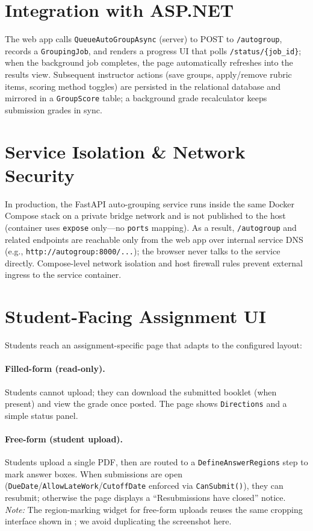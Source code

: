 \documentclass[ms,twoside,print]{nuthesis}
\begin{document}
\section{Integration with ASP.NET}
The web app calls \texttt{QueueAutoGroupAsync} (server) to POST to \texttt{/autogroup}, records a \texttt{GroupingJob}, and renders a progress UI that polls \texttt{/status/\{job\_id\}}; when the background job completes, the page automatically refreshes into the results view. Subsequent instructor actions (save groups, apply/remove rubric items, scoring method toggles) are persisted in the relational database and mirrored in a \texttt{GroupScore} table; a background grade recalculator keeps submission grades in sync.

\section{Service Isolation \& Network Security}
In production, the FastAPI auto-grouping service runs inside the same Docker Compose stack on a private bridge network and is not published to the host (container uses \texttt{expose} only—no \texttt{ports} mapping). As a result, \texttt{/autogroup} and related endpoints are reachable only from the web app over internal service DNS (e.g., \texttt{http://autogroup:8000/...}); the browser never talks to the service directly. Compose-level network isolation and host firewall rules prevent external ingress to the service container.


\section{Student-Facing Assignment UI}
Students reach an assignment-specific page that adapts to the configured layout:

\paragraph{Filled-form (read-only).}
Students cannot upload; they can download the submitted booklet (when present) and view the grade once posted. The page shows \texttt{Directions} and a simple status panel.

\paragraph{Free-form (student upload).}
Students upload a single PDF, then are routed to a \texttt{DefineAnswerRegions} step to mark answer boxes. When submissions are open (\texttt{DueDate}/\texttt{AllowLateWork}/\texttt{CutoffDate} enforced via \texttt{CanSubmit()}), they can resubmit; otherwise the page displays a \enquote{Resubmissions have closed} notice. \emph{Note:} The region-marking widget for free-form uploads reuses the same cropping interface shown in ; we avoid duplicating the screenshot here.
\end{document}
